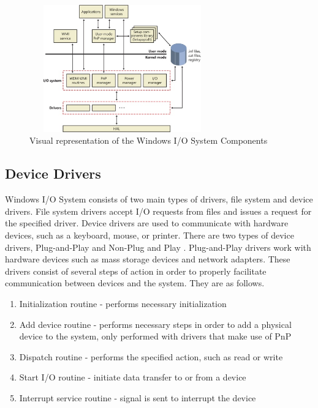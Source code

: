 \documentclass[10pt, onecolumn]{IEEEtran}
\begin{document}
		\begin{figure}[h]
			\centering
			\includegraphics[width=8cm, height=5.5cm]{./pic.eps}
			\captionsetup{justification=centering}
			\caption{Visual representation of the Windows I/O System Components}
        \end{figure}
            
        \subsection{Device Drivers}
            Windows I/O System consists of two main types of drivers, file system and device drivers. File system drivers accept I/O requests from files and issues a request for the specified driver. Device drivers are used to communicate with hardware devices, such as a keyboard, mouse, or printer. There are two types of device drivers, Plug-and-Play and Non-Plug and Play \cite{wio}. Plug-and-Play drivers work with hardware devices such as mass storage devices and network adapters. These drivers consist of several steps of action in order to properly facilitate communication between devices and the system. They are as follows.
            
            \begin{enumerate}
                \item Initialization routine - performs necessary initialization
                \item Add device routine - performs necessary steps in order to add a physical device to the system, only performed with drivers that make use of PnP
                \item Dispatch routine - performs the specified action, such as read or write
                \item Start I/O routine - initiate data transfer to or from a device
                \item Interrupt service routine - signal is sent to interrupt the device
            \end{enumerate}
        
\end{document}
